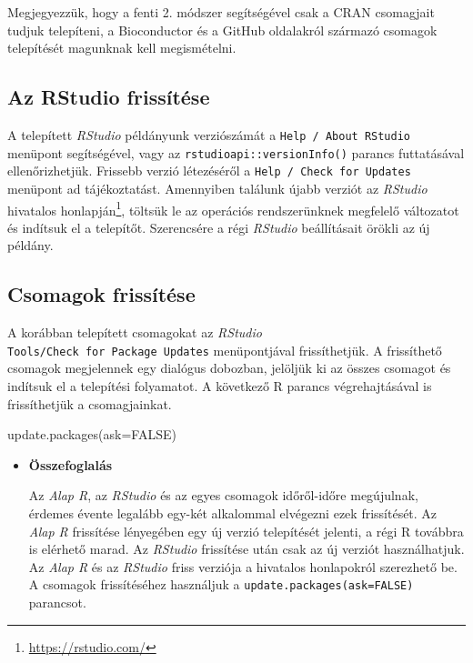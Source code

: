 \documentclass[
]{book}
\newenvironment{Shaded}{\begin{snugshade}}{\end{snugshade}}
\newcommand{\AttributeTok}[1]{\textcolor[rgb]{0.77,0.63,0.00}{#1}}
\newcommand{\ConstantTok}[1]{\textcolor[rgb]{0.00,0.00,0.00}{#1}}
\newcommand{\FunctionTok}[1]{\textcolor[rgb]{0.00,0.00,0.00}{#1}}
\newcommand{\NormalTok}[1]{#1}
\DeclareRobustCommand{\href}[2]{#2\footnote{\url{#1}}}
\newenvironment{rmdblock}[1]
  {\begin{shaded*}
  \begin{itemize}
  \renewcommand{\labelitemi}{
    \raisebox{-.7\height}[0pt][0pt]{
      {\setkeys{Gin}{width=3em,keepaspectratio}\texttt{[image: images/\#1]}}
    }
  }
  \item
  }
  {
  \end{itemize}
  \end{shaded*}
  }
\newenvironment{rmdsummary}
  {\begin{rmdblock}{summary}}
  {\end{rmdblock}}
\begin{document}
Megjegyezzük, hogy a fenti 2. módszer segítségével csak a CRAN csomagjait tudjuk telepíteni, a Bioconductor és a GitHub oldalakról származó csomagok telepítését magunknak kell megismételni.

\hypertarget{az-rstudio-frissuxedtuxe9se}{%
\subsection{Az RStudio frissítése}\label{az-rstudio-frissuxedtuxe9se}}

A telepített \emph{RStudio} példányunk verziószámát a \texttt{Help\ /\ About\ RStudio} menüpont segítségével, vagy az \texttt{rstudioapi::versionInfo()} parancs futtatásával ellenőrizhetjük. Frissebb verzió létezéséről a \texttt{Help\ /\ Check\ for\ Updates} menüpont ad tájékoztatást. Amennyiben találunk újabb verziót az \emph{RStudio} hivatalos \href{https://rstudio.com/}{honlapján}, töltsük le az operációs rendszerünknek megfelelő változatot és indítsuk el a telepítőt. Szerencsére a régi \emph{RStudio} beállításait örökli az új példány.

\hypertarget{csomagok-frissuxedtuxe9se}{%
\subsection{Csomagok frissítése}\label{csomagok-frissuxedtuxe9se}}

A korábban telepített csomagokat az \emph{RStudio} \texttt{Tools/Check\ for\ Package\ Updates} menüpontjával frissíthetjük. A frissíthető csomagok megjelennek egy dialógus dobozban, jelöljük ki az összes csomagot és indítsuk el a telepítési folyamatot. A következő R parancs végrehajtásával is frissíthetjük a csomagjainkat.

\begin{Shaded}
\begin{Highlighting}[]
\FunctionTok{update.packages}\NormalTok{(}\AttributeTok{ask=}\ConstantTok{FALSE}\NormalTok{) }
\end{Highlighting}
\end{Shaded}

\begin{rmdsummary}
\textbf{Összefoglalás}

Az \emph{Alap R}, az \emph{RStudio} és az egyes csomagok időről-időre
megújulnak, érdemes évente legalább egy-két alkalommal elvégezni ezek
frissítését. Az \emph{Alap R} frissítése lényegében egy új verzió
telepítését jelenti, a régi R továbbra is elérhető marad. Az
\emph{RStudio} frissítése után csak az új verziót használhatjuk. Az
\emph{Alap R} és az \emph{RStudio} friss verziója a hivatalos
honlapokról szerezhető be. A csomagok frissítéséhez használjuk a
\texttt{update.packages(ask=FALSE)} parancsot.
\end{rmdsummary}
\end{document}
